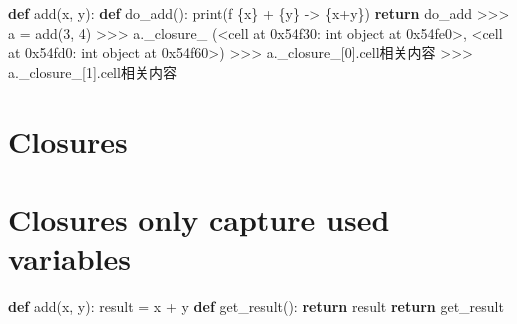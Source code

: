 \documentclass[
  letterpaper,
  DIV=11,
  numbers=noendperiod]{scrreprt}
\newenvironment{Shaded}{\begin{snugshade}}{\end{snugshade}}
\newcommand{\BaseNTok}[1]{\textcolor[rgb]{0.68,0.00,0.00}{#1}}
\newcommand{\BuiltInTok}[1]{\textcolor[rgb]{0.00,0.23,0.31}{#1}}
\newcommand{\ControlFlowTok}[1]{\textcolor[rgb]{0.00,0.23,0.31}{\textbf{#1}}}
\newcommand{\DecValTok}[1]{\textcolor[rgb]{0.68,0.00,0.00}{#1}}
\newcommand{\KeywordTok}[1]{\textcolor[rgb]{0.00,0.23,0.31}{\textbf{#1}}}
\newcommand{\NormalTok}[1]{\textcolor[rgb]{0.00,0.23,0.31}{#1}}
\newcommand{\OperatorTok}[1]{\textcolor[rgb]{0.37,0.37,0.37}{#1}}
\newcommand{\SpecialCharTok}[1]{\textcolor[rgb]{0.37,0.37,0.37}{#1}}
\newcommand{\SpecialStringTok}[1]{\textcolor[rgb]{0.13,0.47,0.30}{#1}}
\begin{document}
\begin{Shaded}
\begin{Highlighting}[]
\KeywordTok{def}\NormalTok{ add(x, y):}
    \KeywordTok{def}\NormalTok{ do\_add():}
        \BuiltInTok{print}\NormalTok{(}\SpecialStringTok{f\textquotesingle{} }\SpecialCharTok{\{}\NormalTok{x}\SpecialCharTok{\}}\SpecialStringTok{ + }\SpecialCharTok{\{}\NormalTok{y}\SpecialCharTok{\}}\SpecialStringTok{ {-}\textgreater{} }\SpecialCharTok{\{}\NormalTok{x}\OperatorTok{+}\NormalTok{y}\SpecialCharTok{\}}\SpecialStringTok{\textquotesingle{}}\NormalTok{)}
    \ControlFlowTok{return}\NormalTok{ do\_add}
\OperatorTok{\textgreater{}\textgreater{}\textgreater{}}\NormalTok{ a }\OperatorTok{=}\NormalTok{ add(}\DecValTok{3}\NormalTok{, }\DecValTok{4}\NormalTok{)}
\OperatorTok{\textgreater{}\textgreater{}\textgreater{}}\NormalTok{ a.\_closure\_}
\NormalTok{(}\OperatorTok{\textless{}}\NormalTok{cell at }\BaseNTok{0x54f30}\NormalTok{: }\BuiltInTok{int} \BuiltInTok{object}\NormalTok{ at }\BaseNTok{0x54fe0}\OperatorTok{\textgreater{}}\NormalTok{, }\OperatorTok{\textless{}}\NormalTok{cell at }\BaseNTok{0x54fd0}\NormalTok{: }\BuiltInTok{int} \BuiltInTok{object}\NormalTok{ at }\BaseNTok{0x54f60}\OperatorTok{\textgreater{}}\NormalTok{) }\OperatorTok{\textgreater{}\textgreater{}\textgreater{}}\NormalTok{ a.\_closure\_[}\DecValTok{0}\NormalTok{].cell相关内容}
\OperatorTok{\textgreater{}\textgreater{}\textgreater{}}\NormalTok{ a.\_closure\_[}\DecValTok{1}\NormalTok{].cell相关内容 }
\end{Highlighting}
\end{Shaded}


\chapter{Closures}\label{closures-2}


\chapter{Closures only capture used
variables}\label{closures-only-capture-used-variables}

\begin{Shaded}
\begin{Highlighting}[]
\KeywordTok{def}\NormalTok{ add(x, y):}
\NormalTok{    result }\OperatorTok{=}\NormalTok{ x }\OperatorTok{+}\NormalTok{ y}
    \KeywordTok{def}\NormalTok{ get\_result():}
        \ControlFlowTok{return}\NormalTok{ result}
    \ControlFlowTok{return}\NormalTok{ get\_result }
\end{Highlighting}
\end{Shaded}
\end{document}
